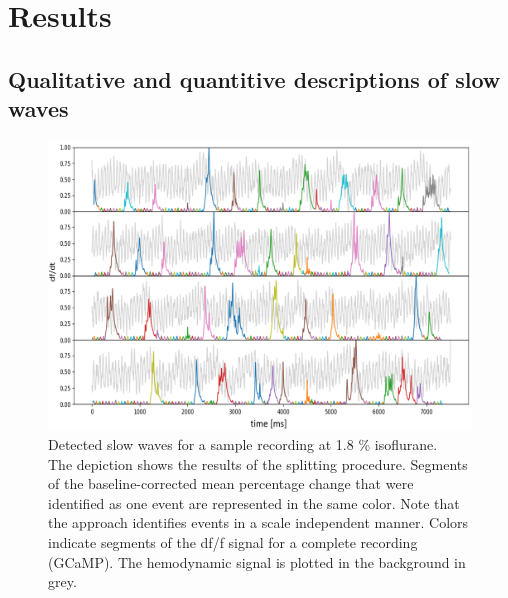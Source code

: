 
\chapter{Results} %

\section{Qualitative and quantitive descriptions of slow waves}
\begin{figure}[!htb]
\centering
\includegraphics[width=\textwidth,height=\textheight,keepaspectratio]{Figures/slow_wave_segmentation}
\decoRule
\caption[Detected slow waves for a sample recording]{Detected slow waves for a sample recording at 1.8 \% isoflurane.\\ The depiction shows the results of the splitting procedure. Segments of the baseline-corrected mean percentage change that were identified as one event are represented in the same color. Note that the approach identifies events in a scale independent manner. Colors indicate segments of the df/f signal for a complete recording (GCaMP). The hemodynamic signal is plotted in the background in grey.}
\label{fig:slow_wave_segmentation}
\end{figure}

\label{Chapter4} %

